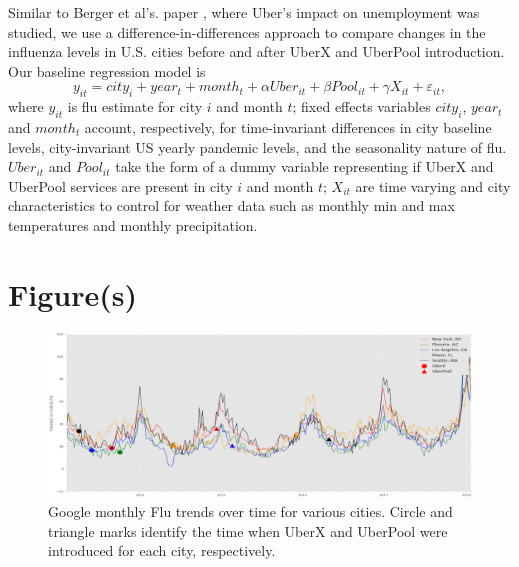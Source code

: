 \documentclass[a4paper,12pt]{article}
\begin{document}
Similar to Berger et al's. paper \cite{berger2017drivers}, where Uber's impact on unemployment was studied, we use a difference-in-differences approach to compare changes in the influenza levels in U.S. cities before and after UberX and UberPool introduction. Our baseline regression model is
\[
y_{it}=city_{i}+year_{t}+month_{t}+\alpha Uber_{it}+\beta Pool_{it}+\gamma X_{it}+ \varepsilon_{it},
\]
where $y_{it}$ is flu estimate for city $i$ and month $t$; fixed effects variables $city_{i}$, $year_{t}$ and $month_{t}$ account, respectively, for time-invariant differences in city baseline levels, city-invariant US yearly pandemic levels, and the seasonality nature of flu. $Uber_{it}$ and $ Pool_{it}$ take the form of a dummy variable representing if UberX and UberPool services are present in city $i$ and month $t$; $X_{it}$ are time varying and city characteristics to control for weather data such as monthly min and max temperatures and  monthly precipitation.










\section{Figure(s)}

\begin{figure}[htp]
\centering
\includegraphics[width=13cm]{images/fig1}
\vspace{-0.5em}
\caption{Google monthly Flu trends over time for various cities. Circle and triangle marks identify the time when UberX and UberPool were introduced for each city, respectively.}
\label{fig:Uber}
\end{figure}
\end{document}
